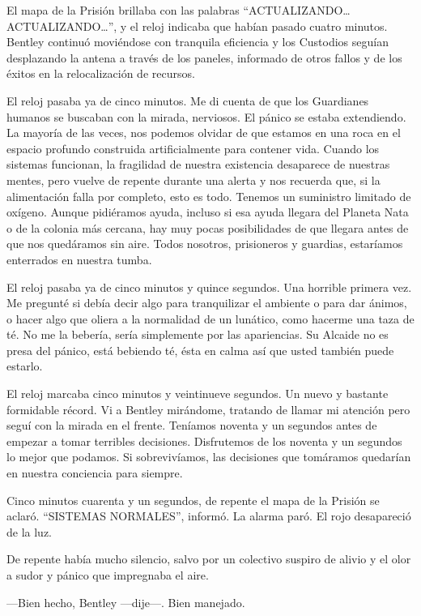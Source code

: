 El mapa de la Prisión brillaba con las palabras
``ACTUALIZANDO\ldots{} ACTUALIZANDO\ldots{}'', y el reloj indicaba que
habían pasado cuatro minutos. Bentley continuó moviéndose con tranquila
eficiencia y los Custodios seguían desplazando la antena a través de los
paneles, informado de otros fallos y de los éxitos en la relocalización
de recursos.

El reloj pasaba ya de cinco minutos. Me di cuenta de que los Guardianes
humanos se buscaban con la mirada, nerviosos. El pánico se estaba
extendiendo. La mayoría de las veces, nos podemos olvidar de que estamos
en una roca en el espacio profundo construida artificialmente para
contener vida. Cuando los sistemas funcionan, la fragilidad de nuestra
existencia desaparece de nuestras mentes, pero vuelve de repente durante
una alerta y nos recuerda que, si la alimentación falla por completo,
esto es todo. Tenemos un suministro limitado de oxígeno. Aunque
pidiéramos ayuda, incluso si esa ayuda llegara del Planeta Nata o de la
colonia más cercana, hay muy pocas posibilidades de que llegara antes de
que nos quedáramos sin aire. Todos nosotros, prisioneros y guardias,
estaríamos enterrados en nuestra tumba.

El reloj pasaba ya de cinco minutos y quince segundos. Una horrible
primera vez. Me pregunté si debía decir algo para tranquilizar el
ambiente o para dar ánimos, o hacer algo que oliera a la normalidad de
un lunático, como hacerme una taza de té. No me la bebería, sería
simplemente por las apariencias. Su Alcaide no es presa del pánico, está
bebiendo té, ésta en calma así que usted también puede estarlo.

El reloj marcaba cinco minutos y veintinueve segundos. Un nuevo y
bastante formidable récord. Vi a Bentley mirándome, tratando de llamar
mi atención pero seguí con la mirada en el frente. Teníamos noventa y un
segundos antes de empezar a tomar terribles decisiones. Disfrutemos de
los noventa y un segundos lo mejor que podamos. Si sobrevivíamos, las
decisiones que tomáramos quedarían en nuestra conciencia para siempre.

Cinco minutos cuarenta y un segundos, de repente el mapa de la Prisión
se aclaró. ``SISTEMAS NORMALES'', informó. La alarma paró. El rojo
desapareció de la luz.

De repente había mucho silencio, salvo por un colectivo suspiro de
alivio y el olor a sudor y pánico que impregnaba el aire.

---Bien hecho, Bentley ---dije---. Bien manejado.

